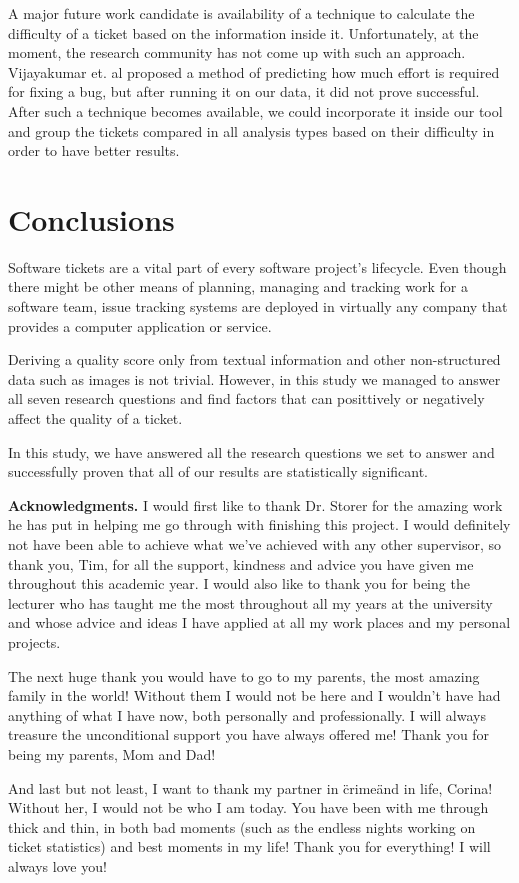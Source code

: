 \documentclass{mpaper}
\begin{document}
A major future work candidate is availability of a technique to calculate the difficulty of a ticket based on the information
inside it. Unfortunately, at the moment, the research community has not come up with such an approach. 
Vijayakumar et. al \cite{vijayakumar2014much} proposed a method of predicting how much effort is required for fixing 
a bug, but after running it on our data, it did not prove successful. After such a technique becomes available, we could 
incorporate it inside our tool and group the tickets compared in all analysis types based on their difficulty in order to 
have better results.

\section{Conclusions}\label{conclusions}

Software tickets are a vital part of every software project's lifecycle. Even though there might be other means
of planning, managing and tracking work for a software team, issue tracking systems are deployed in virtually any company
that provides a computer application or service.

Deriving a quality score only from textual information and other non-structured data such as images is not trivial. 
However, in this study we managed to answer all seven research questions and find factors that can posittively or 
negatively affect the quality of a ticket. 


In this study, we have answered all the research 
questions we set to answer and successfully proven that all of our results are statistically significant. 


\vskip8pt \noindent
{\bf Acknowledgments.}
I would first like to thank Dr. Storer for the amazing work he has put in helping me go through with finishing 
this project. I would definitely not have been able to achieve what we've achieved with any other supervisor, so 
thank you, Tim, for all the support, kindness and advice you have given me throughout this academic year. I would 
also like to thank you for being the lecturer who has taught me the most throughout all my years at the university
and whose advice and ideas I have applied at all my work places and my personal projects.

The next huge thank you would have to go to my parents, the most amazing family in the world! Without them I would 
not be here and I wouldn't have had anything of what I have now, both personally and professionally. 
I will always treasure the unconditional support you have always offered me! Thank you for being my parents, Mom and Dad!

And last but not least, I want to thank my partner in \"crime\" and in life, Corina! Without her, I would not be who I 
am today. You have been with me through thick and thin, in both bad moments (such as the endless nights working 
on ticket statistics) and best moments in my life! Thank you for everything! I will always love you!



\end{document}
